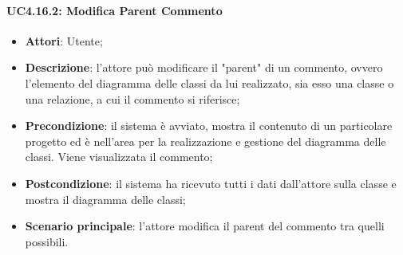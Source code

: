 \paragraph{UC4.16.2: Modifica Parent Commento}
\label{UC4.16.2}
\begin{itemize}
	\item \textbf{Attori}: Utente;
	\item \textbf{Descrizione}: l'attore può modificare il "parent" di un commento, ovvero l'elemento del diagramma delle classi da lui realizzato, sia esso una classe o una relazione, a cui il commento si riferisce;
	\item \textbf{Precondizione}: il sistema è avviato, mostra il contenuto di un particolare progetto ed è nell'area per la realizzazione e gestione del diagramma delle classi. Viene visualizzata il commento;
	\item \textbf{Postcondizione}: il sistema ha ricevuto tutti i dati dall'attore sulla classe e mostra il diagramma delle classi;
	\item \textbf{Scenario principale}: l'attore modifica il parent del commento tra quelli possibili.
\end{itemize}

